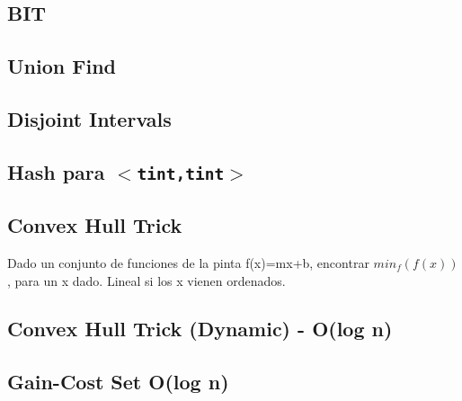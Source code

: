 \subsection{BIT} %
\subsection{Union Find}
\subsection{Disjoint Intervals}
\subsection{Hash para \texttt{$<$tint,tint$>$}} %
\subsection{Convex Hull Trick}
Dado un conjunto de funciones de la pinta f(x)=mx+b, encontrar $min_f(f(x))$, para un x dado. Lineal si los x vienen ordenados.
\subsection{Convex Hull Trick (Dynamic) - O(log n)}
\subsection{Gain-Cost Set O(log n)} %
